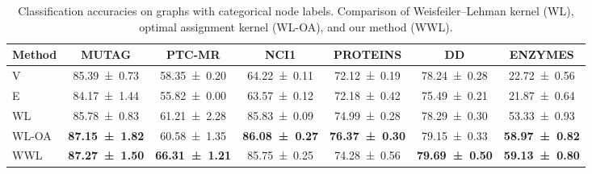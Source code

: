 \documentclass{article}
\begin{document}
\begin{table}[t]
\centering
\caption{Classification accuracies on graphs with categorical node labels. Comparison of Weisfeiler--Lehman kernel (WL), optimal assignment kernel (WL-OA), and our method (WWL).}
\label{results_disc}

  \renewrobustcmd{\boldmath}{}
  \fontsize{9.5}{10.5}\selectfont
\begin{sc}
    \setlength{\tabcolsep}{5.00pt}
    
\begin{tabular}{lcccccc}
    \toprule
    Method & MUTAG & PTC-MR & NCI1  & PROTEINS & DD & ENZYMES\\
    \midrule
V & \num{85.39 \pm 0.73} & \num{58.35 \pm 0.20}\phantom{} & \num{64.22 \pm 0.11} & \num{72.12 \pm 0.19}\phantom{} & \num{78.24 \pm 0.28} & \num{22.72 \pm 0.56}\\
E & \num{84.17 \pm 1.44} & \num{55.82 \pm 0.00}\phantom{} & \num{63.57 \pm 0.12} & \num{72.18 \pm 0.42}\phantom{} & \num{75.49 \pm 0.21} & \num{21.87 \pm 0.64}\\
\midrule
WL    & \num{85.78 \pm 0.83} & \num{61.21 \pm 2.28}\phantom{} & \num{85.83 \pm 0.09}  & \num{74.99 \pm 0.28}\phantom{} & \num{78.29 \pm 0.30} & \num{53.33 \pm 0.93}\\
WL-OA & \bfseries\num{87.15 \pm 1.82} & \num{60.58 \pm 1.35}\phantom{} & \bfseries\num{86.08 \pm 0.27} &  \bfseries\num{76.37 \pm 0.30} & \num{79.15 \pm 0.33} & \bfseries\num{58.97 \pm 0.82}\\
\midrule
WWL  & \bfseries\num{87.27 \pm 1.50} & \bfseries\num{66.31 \pm  1.21} & \num{85.75 \pm 0.25} &  \num{74.28 \pm 0.56}\phantom{} & \bfseries\num{79.69 \pm 0.50} & \bfseries\num{59.13 \pm 0.80}\\
    \bottomrule
    \end{tabular}
\end{sc}
\end{table}
\end{document}
